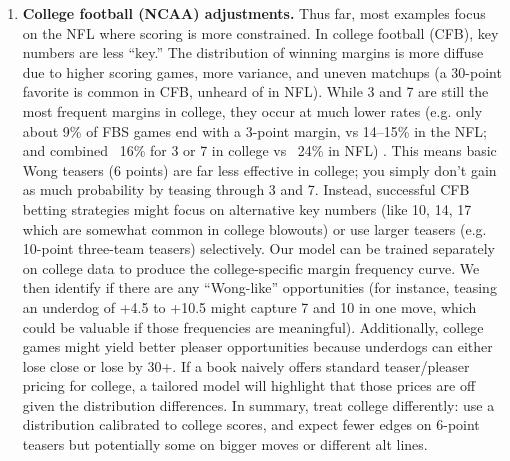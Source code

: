\documentclass[12pt]{article}
\begin{document}
\begin{enumerate}
    \item \textbf{College football (NCAA) adjustments.} Thus far, most examples focus on the NFL where scoring is more constrained. In college football (CFB), key numbers are less “key.” The distribution of winning margins is more diffuse due to higher scoring games, more variance, and uneven matchups (a 30-point favorite is common in CFB, unheard of in NFL). While 3 and 7 are still the most frequent margins in college, they occur at much lower rates (e.g. only about 9\% of FBS games end with a 3-point margin, vs 14--15\% in the NFL; and combined ~16\% for 3 or 7 in college vs ~24\% in NFL) \cite{Moxley2023}. This means basic Wong teasers (6 points) are far less effective in college; you simply don’t gain as much probability by teasing through 3 and 7. Instead, successful CFB betting strategies might focus on alternative key numbers (like 10, 14, 17 which are somewhat common in college blowouts) or use larger teasers (e.g. 10-point three-team teasers) selectively. Our model can be trained separately on college data to produce the college-specific margin frequency curve. We then identify if there are any “Wong-like” opportunities (for instance, teasing an underdog of +4.5 to +10.5 might capture 7 and 10 in one move, which could be valuable if those frequencies are meaningful). Additionally, college games might yield better pleaser opportunities because underdogs can either lose close or lose by 30+. If a book naively offers standard teaser/pleaser pricing for college, a tailored model will highlight that those prices are off given the distribution differences. In summary, treat college differently: use a distribution calibrated to college scores, and expect fewer edges on 6-point teasers but potentially some on bigger moves or different alt lines.
\end{enumerate}
\end{document}
